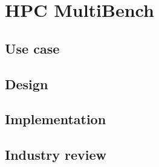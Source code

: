 \chapter{HPC MultiBench}
\label{ch:hpc-multibench} %

\section{Use case}
\label{sec:hpc-multibench-use-case} %

\section{Design}
\label{sec:hpc-multibench-design} %

\section{Implementation}
\label{sec:hpc-multibench-implementation} %

\section{Industry review}
\label{sec:hpc-multibench-industry-review} %
